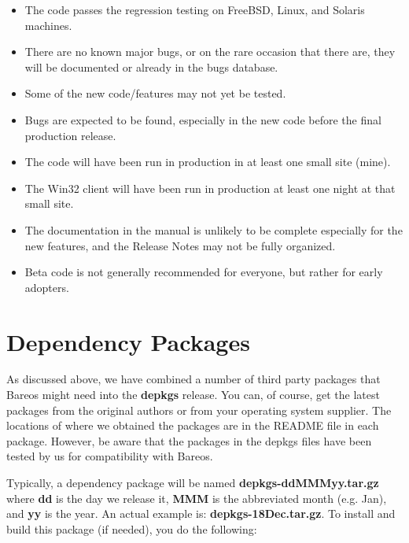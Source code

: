 \begin{itemize}
\item The code passes the regression testing on FreeBSD, Linux, and Solaris
  machines.

\item There are no known major bugs, or on the rare occasion that
  there are, they will be documented or already in the bugs database.

\item Some of the new code/features may not yet be tested.

\item Bugs are expected to be found, especially in the new
  code before the final production release.

\item The code will have been run in production in at least one small
  site (mine).

\item The Win32 client will have been run in production at least
  one night at that small site.

\item The documentation in the manual is unlikely to be complete especially
  for the new features, and the Release Notes may not be fully
  organized.

\item Beta code is not generally recommended for everyone, but
  rather for early adopters.
\end{itemize}


\label{Dependency}
\section{Dependency Packages}

As discussed above, we have combined a number of third party packages that
Bareos might need into the {\bf depkgs} release. You can,
of course, get the latest packages from the original authors or
from your operating system supplier. The locations of
where we obtained the packages are in the README file in each package.
However, be aware that the packages in the depkgs files have been tested by us
for compatibility with Bareos.

Typically, a dependency package will be named {\bf depkgs-ddMMMyy.tar.gz}
where {\bf dd} is the day we release it, {\bf MMM}
is the abbreviated month (e.g. Jan), and {\bf yy} is the year. An actual
example is: {\bf depkgs-18Dec.tar.gz}. To install and build this package (if
needed), you do the following:

